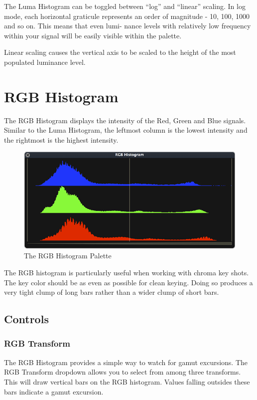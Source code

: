\documentclass[10,letterpaper,]{report}
\begin{document}
The Luma Histogram can be toggled between ``log'' and ``linear''
scaling. In log mode, each horizontal graticule represents an order of
magnitude - 10, 100, 1000 and so on. This means that even lumi- nance
levels with relatively low frequency within your signal will be easily
visible within the palette.

Linear scaling causes the vertical axis to be scaled to the height of
the most populated luminance level.

\chapter{RGB Histogram}

The RGB Histogram displays the intensity of the Red, Green and Blue
signals. Similar to the Luma Histogram, the leftmost column is the
lowest intensity and the rightmost is the highest intensity.

\begin{figure}[htbp]
\centering
\includegraphics{images/RGBHistogram.png}
\caption{The RGB Histogram Palette}
\end{figure}

The RGB histogram is particularly useful when working with chroma key
shots. The key color should be as even as possible for clean keying.
Doing so produces a very tight clump of long bars rather than a wider
clump of short bars.

\section{Controls}

\subsection{RGB Transform}

The RGB Histogram provides a simple way to watch for gamut excursions.
The RGB Transform dropdown allows you to select from among three
transforms. This will draw vertical bars on the RGB histogram. Values
falling outsides these bars indicate a gamut excursion.
\end{document}
